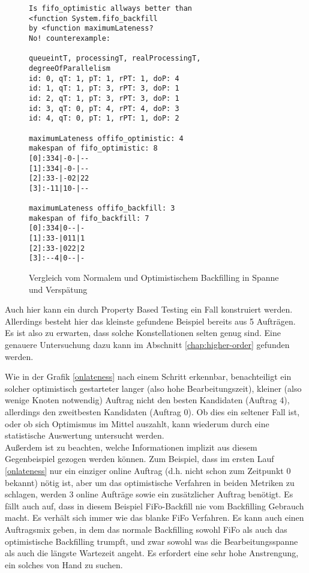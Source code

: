 \begin{figure}
\centering
\begin{verbatim}
Is fifo_optimistic allways better than
<function System.fifo_backfill
by <function maximumLateness?
No! counterexample:

queueintT, processingT, realProcessingT, degreeOfParallelism
id: 0, qT: 1, pT: 1, rPT: 1, doP: 4
id: 1, qT: 1, pT: 3, rPT: 3, doP: 1
id: 2, qT: 1, pT: 3, rPT: 3, doP: 1
id: 3, qT: 0, pT: 4, rPT: 4, doP: 3
id: 4, qT: 0, pT: 1, rPT: 1, doP: 2

maximumLateness offifo_optimistic: 4
makespan of fifo_optimistic: 8
[0]:334|-0-|--
[1]:334|-0-|--
[2]:33-|-02|22
[3]:-11|10-|--

maximumLateness offifo_backfill: 3
makespan of fifo_backfill: 7
[0]:334|0--|-
[1]:33-|011|1
[2]:33-|022|2
[3]:--4|0--|-
\end{verbatim}
\caption{Vergleich vom Normalem und Optimistischem Backfilling in Spanne und Verspätung}
\label{onlatenessmakespan}
\end{figure}

Auch hier kann ein durch Property Based Testing ein Fall konstruiert werden. Allerdings besteht hier das kleinste gefundene Beispiel bereits aus 5 Aufträgen. Es ist also zu erwarten, dass solche Konstellationen selten genug sind. Eine genauere Untersuchung dazu kann im Abschnitt \ref{chap:higher-order} gefunden werden.
\FloatBarrier

Wie in der Grafik \ref{onlateness} nach einem Schritt erkennbar, benachteiligt ein solcher optimistisch gestarteter langer (also hohe Bearbeitungszeit), kleiner (also wenige Knoten notwendig) Auftrag nicht den besten Kandidaten (Auftrag 4), allerdings den zweitbesten Kandidaten (Auftrag 0). Ob dies ein seltener Fall ist, oder ob sich Optimismus im Mittel auszahlt, kann wiederum durch eine statistische Auswertung untersucht werden.\\

Außerdem ist zu beachten, welche Informationen implizit aus diesem Gegenbeispiel gezogen werden können. Zum Beispiel, dass im ersten Lauf \ref{onlateness} nur ein einziger online Auftrag (d.h. nicht schon zum Zeitpunkt 0 bekannt) nötig ist, aber um das optimistische Verfahren in beiden Metriken zu schlagen, werden 3 online Aufträge sowie ein zusätzlicher Auftrag benötigt. Es fällt auch auf, dass in diesem Beispiel FiFo-Backfill nie vom Backfilling Gebrauch macht. Es verhält sich immer wie das blanke FiFo Verfahren. Es kann auch einen Auftragsmix geben, in dem das normale Backfilling sowohl FiFo als auch das optimistische Backfilling trumpft, und zwar sowohl was die Bearbeitungsspanne als auch die längste Wartezeit angeht.
Es erfordert eine sehr hohe Anstrengung, ein solches von Hand zu suchen.\\

